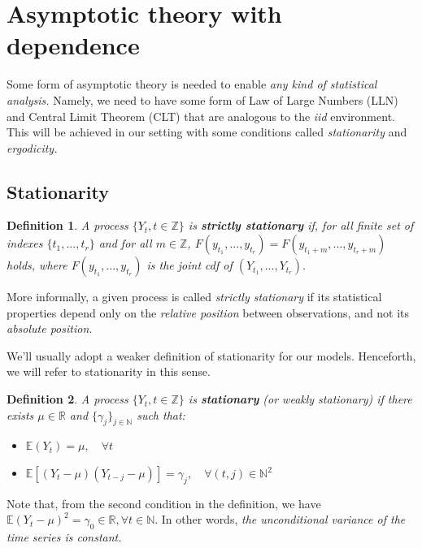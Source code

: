 \documentclass[11pt, a4paper]{report}
\theoremstyle{plain}
\theoremstyle{plain}
\newtheorem{defn}{Definition}[section]
\theoremstyle{remark}
\begin{document}
\section{Asymptotic theory with dependence}

Some form of asymptotic theory is needed to enable \textit{any kind of statistical analysis.} Namely, we need to have some form of Law of Large Numbers (LLN) and Central Limit Theorem (CLT) that are analogous to the \textit{iid} environment. This will be achieved in our setting with some conditions called \textit{stationarity} and \textit{ergodicity.}

\subsection{Stationarity}

\begin{defn}
	A process $\{Y_t, t \in \mathbb{Z} \}$ is \textbf{strictly stationary} if, for all finite set of indexes $\{t_1, ..., t_r\}$ and for all $m \in \mathbb{Z}$, $F(y_{t_1},..., y_{t_r}) = F(y_{t_1+m},..., y_{t_r+m})$ holds, where $F(y_{t_1},..., y_{t_r})$ is the joint cdf of $(Y_{t_1},..., Y_{t_r}).$
\end{defn}

More informally, a given process is called \textit{strictly stationary} if its statistical properties depend only on the \textit{relative position} between observations, and not its \textit{absolute position.}

We'll usually adopt a weaker definition of stationarity for our models. Henceforth, we will refer to stationarity in this sense.

\begin{defn}
	A process $\{Y_t, t \in \mathbb{Z} \}$ is \textbf{stationary} (or weakly stationary) if there exists $\mu \in \mathbb{R}$ and $\{\gamma_j\}_{j \in \mathbb{N}}$ such that:
	\begin{itemize}
		\item $\mathbb{E}(Y_t) = \mu, \hspace{1em} \forall t$
		\item $\mathbb{E}[(Y_t - \mu)(Y_{t-j}-\mu)] = \gamma_j, \hspace{1em} \forall (t,j) \in \mathbb{N}^2$
	\end{itemize}
\end{defn}

	Note that, from the second condition in the definition, we have $\mathbb{E}(Y_t - \mu)^2 = \gamma_0 \in \mathbb{R}, \forall t \in \mathbb{N}.$ In other words, \textit{the unconditional variance of the time series is constant.}
\end{document}
